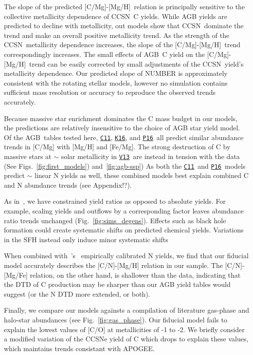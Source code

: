 \documentclass[fleqn,
usenatbib]{mnras}
\newcommand{\cxi}{\texttt{\hyperlink{C11}{C11}}}
\newcommand{\pxvi}{\texttt{\hyperlink{P16}{P16}}}
\newcommand{\kxvi}{\texttt{\hyperlink{K16}{K16}}}
\newcommand{\vxiii}{\texttt{\hyperlink{V13}{V13}}}
\newcommand{\agb}{AGB}
\newcommand{\cc}{CCSN}
\newcommand{\caah}{[C/Mg]-[Mg/H]}
\newcommand{\about}[1]{${\sim} #1$}
\begin{document}
The slope of the predicted \caah\ relation is principally sensitive to the collective metallicity dependence of \cc\ C yields.
While AGB yields are predicted to decline with metallicity, out models show that \cc\ dominate the trend and make an overall positive metallicity trend. 
As the strength of the \cc\ metallicity dependence increases, the slope of the \caah\ trend correspondingly increases. The small effects of \agb\ C yield on the \caah\ trend can be easily corrected by small adjustments of the \cc\ yield's metallicity dependence.
Our predicted slope of NUMBER is approximately consistent with the \citet{LC18} rotating stellar models, however no simulation contains sufficient mass resolution or accuracy to reproduce the observed trends accurately. 

Because massive star enrichment dominates the C mass budget in our models, the predictions are relatively insensitive to the choice of AGB star yield model.
Of the \agb\ tables tested here, \cxi, \kxvi, and \pxvi\ all predict similar abundance trends in [C/Mg] with [Mg/H] and [Fe/Mg]. The strong destruction of C by massive stars at \about{} solar metallicity   in \vxiii\ are instead in tension with the data (See Figs.~\ref{fig:first_models})  and~\ref{fig:agb-ssp})
As both the \cxi\ and \pxvi\ models predict \about{} linear N yields as well, these combined models best explain combined C and N abundance trends (see Appendix!?).

As in~\citet{james+23}, we have constrained yield ratios as opposed to absolute yields. For example, scaling yields and outflows by a corresponding factor leaves abundance ratio trends unchanged (Fig.~\ref{fig:sims_degens}).  Effects such as black hole formation could create systematic shifts on predicted chemical yields.
Variations in the SFH instead only induce minor systematic shifts


When combined with~\citeauthor{james+23}'s~\citeyearpar{james+23} empirically calibrated N yields, we find that our fiducial model accurately describes the [C/N]-[Mg/H] relation in our sample. The [C/N]-[Mg/Fe] relation, on the other hand, is shallower than the data, indicating that the DTD of C production may be sharper than our AGB yield tables would suggest (or the N DTD more extended, or both).

Finally, we compare our models againsts a compilation of literature gas-phase and halo-star abundances (see Fig.~\ref{fig:gas_phase}). Our fiducial model fails to explain the lowest values of [C/O] at metallicities of -1 to -2. We briefly consider a modified variation of the CCSNe yield of C which drops to explain these values, which maintains trends consistant with APOGEE. 
\end{document}
